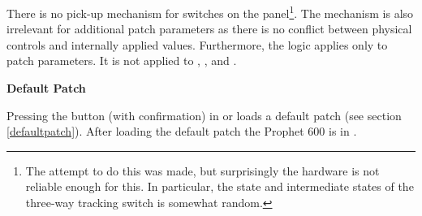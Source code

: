 There is no pick-up mechanism for switches on the panel\footnote{The attempt to do this was made, but surprisingly the hardware is not reliable enough for this. In particular, the state and intermediate states of the three-way tracking switch is somewhat random.}. The mechanism is also irrelevant for additional patch parameters as there is no conflict between physical controls and internally applied values. Furthermore, the logic applies only to patch parameters. It is not applied to \mastertune, \mastervol, \pitchbender and \modwheel.

\textbf{Default Patch}

Pressing the \preset button (with confirmation) in \shiftmode or \shiftlock loads a default patch (see section \ref{defaultpatch}). After loading the default patch the Prophet 600 is in \presetpatch.
